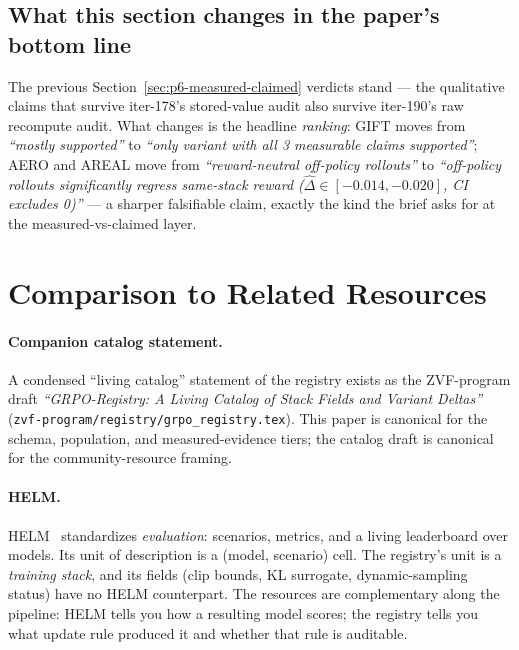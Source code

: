 \documentclass{article}
\providecommand{\secref}[1]{Section~\ref{#1}}
\begin{document}
\subsection{What this section changes in the paper's bottom line}
The previous \secref{sec:p6-measured-claimed} verdicts stand --- the
qualitative claims that survive iter-178's stored-value audit also
survive iter-190's raw recompute audit. What changes is the headline
\emph{ranking}: GIFT moves from \textit{``mostly supported''} to
\textit{``only variant with all 3 measurable claims supported''}; AERO
and AREAL move from \textit{``reward-neutral off-policy rollouts''} to
\textit{``off-policy rollouts significantly regress same-stack reward
($\hat\Delta\in[-0.014,-0.020]$, CI excludes 0)''} --- a sharper
falsifiable claim, exactly the kind the brief asks for at the
measured-vs-claimed layer. \section{Comparison to Related Resources}
\label{sec:p6-related-resources}

\paragraph{Companion catalog statement.} A condensed ``living catalog''
statement of the registry exists as the ZVF-program draft
\emph{``GRPO-Registry: A Living Catalog of Stack Fields and Variant
Deltas''} (\texttt{zvf-program/registry/grpo\_registry.tex}). This paper
is canonical for the schema, population, and measured-evidence tiers; the
catalog draft is canonical for the community-resource framing.

\paragraph{HELM.}
HELM~\citep{liang2022helm} standardizes \emph{evaluation}: scenarios, metrics,
and a living leaderboard over models. Its unit of description is a
(model, scenario) cell. The registry's unit is a \emph{training stack}, and
its fields (clip bounds, KL surrogate, dynamic-sampling status) have no HELM
counterpart. The resources are complementary along the pipeline: HELM tells
you how a resulting model scores; the registry tells you what update rule
produced it and whether that rule is auditable.
\end{document}
